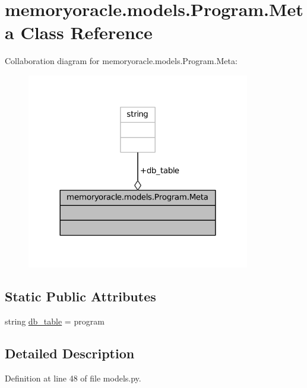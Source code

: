 \hypertarget{classmemoryoracle_1_1models_1_1Program_1_1Meta}{}\section{memoryoracle.\+models.\+Program.\+Meta Class Reference}
\label{classmemoryoracle_1_1models_1_1Program_1_1Meta}


Collaboration diagram for memoryoracle.\+models.\+Program.\+Meta\+:\nopagebreak
\begin{figure}[H]
\begin{center}
\leavevmode
\includegraphics[width=276pt]{classmemoryoracle_1_1models_1_1Program_1_1Meta__coll__graph}
\end{center}
\end{figure}
\subsection*{Static Public Attributes}
\begin{DoxyCompactItemize}
\item 
string \hyperlink{classmemoryoracle_1_1models_1_1Program_1_1Meta_ada964e27ebbdc3cb9d5cb7ae8fd2d06c}{db\+\_\+table} = \textquotesingle{}program\textquotesingle{}
\end{DoxyCompactItemize}


\subsection{Detailed Description}


Definition at line 48 of file models.\+py.



